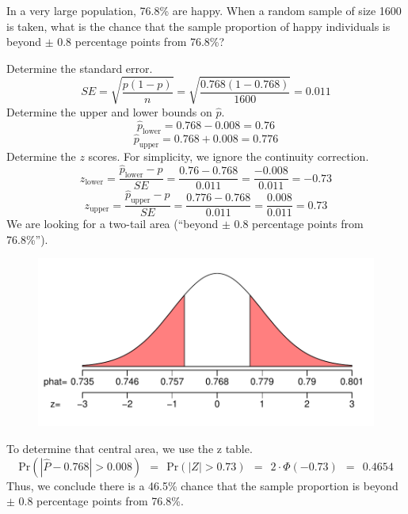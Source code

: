 
\begin{question}
In a very large population, 76.8\% are happy. When a random sample of
size 1600 is taken, what is the chance that the sample proportion of
happy individuals is beyond \(\pm\) 0.8 percentage points from 76.8\%?
\end{question}

\begin{solution}
Determine the standard error.
\[SE = \sqrt{\frac{p(1-p)}{n}} = \sqrt{\frac{0.768(1-0.768)}{1600}} = 0.011 \]
Determine the upper and lower bounds on \(\hat{p}\).
\[\hat{p}_{\text{lower}} = 0.768-0.008 = 0.76 \]
\[\hat{p}_{\text{upper}} = 0.768+0.008 = 0.776 \] Determine the \(z\)
scores. For simplicity, we ignore the continuity correction.
\[z_{\text{lower}} = \frac{\hat{p}_{\text{lower}}-p}{SE} = \frac{0.76-0.768}{0.011} = 
\frac{-0.008}{0.011} = -0.73 \]
\[z_{\text{upper}} = \frac{\hat{p}_{\text{upper}}-p}{SE} = \frac{0.776-0.768}{0.011} = \frac{0.008}{0.011} = 0.73 \]
We are looking for a two-tail area (``beyond \(\pm\) 0.8 percentage
points from 76.8\%'').

\begin{figure}[htbp]
\centering
\includegraphics{phat_sampling_outer-1.pdf}
\caption{}
\end{figure}

To determine that central area, we use the z table.
\[\text{Pr}\left(|\hat{P}-0.768| > 0.008\right) ~~=~~ \text{Pr}\left(|Z| > 0.73\right) ~~=~~ 2\cdot\Phi(-0.73) ~~=~~ 0.4654 \]
Thus, we conclude there is a 46.5\% chance that the sample proportion is
beyond \(\pm\) 0.8 percentage points from 76.8\%.
\end{solution}

